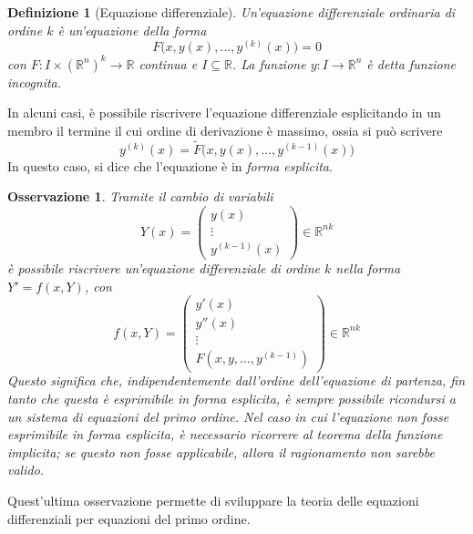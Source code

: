 \documentclass[12pt]{scrartcl}
\theoremstyle{style}
\newtheorem{definizione}{Definizione}[section]
\newtheorem{osservazione}{Osservazione}[section]
\numberwithin{equation}{subsection}
\begin{document}
\begin{definizione}
	[Equazione differenziale]
	Un'equazione differenziale ordinaria di ordine $k$ \`e un'equazione della forma
	\[
	F\big(x,y(x),\ldots, y^{(k)} (x)\big) = 0 
	\] 
	con $F : I \times (\mathbb{R}^n)^k \to \mathbb{R}$ continua e $I \subseteq \mathbb{R}$.
	La funzione $y : I \to \mathbb{R}^n$ \`e detta \textit{funzione incognita}.
\end{definizione}
\noindent In alcuni casi, \`e possibile riscrivere l'equazione differenziale esplicitando in un membro il termine il cui ordine di derivazione \`e massimo, ossia si pu\`o scrivere
\[
y^{(k)} (x) = \widetilde{F}\big(x ,y(x) ,\ldots,y^{(k-1)} (x)\big)
\] 
In questo caso, si dice che l'equazione \`e in \textit{forma esplicita}.
\begin{osservazione}
Tramite il cambio di variabili
\[
Y(x) = \begin{pmatrix} y(x)\\ \vdots\\ y^{(k-1)} (x) \end{pmatrix} \in \mathbb{R}^{nk} 
\] 
\`e possibile riscrivere un'equazione differenziale di ordine $k$ nella forma $Y'= f(x,Y)$, con 
\[
f(x,Y) = \begin{pmatrix} y'(x)\\ y''(x) \\ \vdots\\ F(x,y,\ldots,y^{(k-1)}) \end{pmatrix} \in \mathbb{R}^{nk} 
\] 
Questo significa che, indipendentemente dall'ordine dell'equazione di partenza, fin tanto che questa \`e esprimibile in forma esplicita, \`e sempre possibile ricondursi a un sistema di equazioni del primo ordine.
Nel caso in cui l'equazione non fosse esprimibile in forma esplicita, \`e necessario ricorrere al teorema della funzione implicita; se questo non fosse applicabile, allora il ragionamento non sarebbe valido.
\end{osservazione}
\noindent Quest'ultima osservazione permette di sviluppare la teoria delle equazioni differenziali per equazioni del primo ordine.
\end{document}
